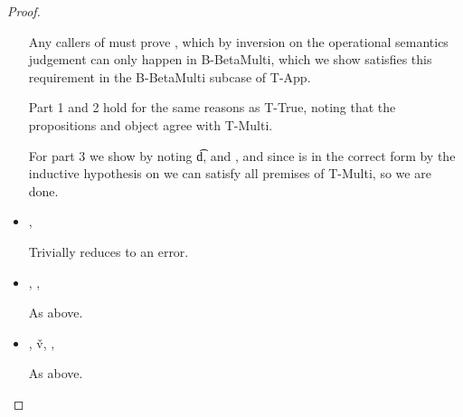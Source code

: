 \begin{lemma}
\begin{proof}
\begin{case}[T-DefMethod]
\begin{itemize}
\begin{subcase}[B-DefMethod]
        Any callers of  must prove {}, which by inversion on the operational semantics judgement
        can only happen in B-BetaMulti, which we show satisfies this requirement in the B-BetaMulti subcase of T-App.

                                Part 1 and 2 hold for the same reasons as T-True, noting that the propositions
                                and object agree with T-Multi.

For part 3 we show
by noting \judgementtwo {} { {\t{d}}},
  and
  , and since \disptable{} is in the correct form by the inductive
  hypothesis on {} we can satisfy all premises of T-Multi, so we are done.


      \end{subcase}

    \item[]
      \begin{subcase}[BE-DefMethod1]
        \opsem {\openv{}}
               {}
               {\errorval{\v{}}},
        \opsem {\openv{}}
                  {\e{}}
                {\errorval{\v{}}}

                Trivially reduces to an error.

      \end{subcase}
    \item[]
      \begin{subcase}[BE-DefMethod2]
        \opsem {\openv{}}
         {}
         { {\disptable{}}},
  \opsem {\openv{}}
         {}
         {\errorval{\v{}}},
        \opsem {\openv{}}
                  {\e{}}
                {\errorval{\v{}}}

                As above.
      \end{subcase}
    \item[]
      \begin{subcase}[BE-DefMethod3]
        \opsem {\openv{}}
         {}
         { {\disptable{}}},
  \opsem {\openv{}}
         {}
         {\v{v}},
  \opsem {\openv{}}
         {}
         {\errorval{\v{}}},
        \opsem {\openv{}}
                  {\e{}}
                {\errorval{\v{}}}

                As above.

      \end{subcase}
  \end{itemize}
\end{case}


\end{proof}
\end{lemma}

